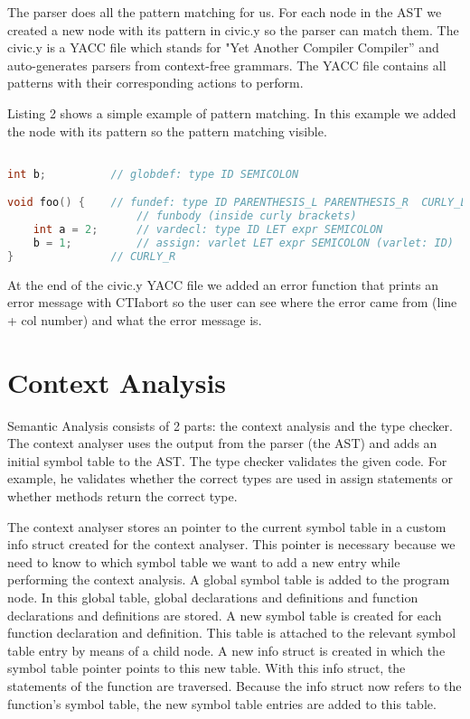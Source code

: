 \documentclass{uva-inf-article}
\begin{document}
The parser does all the pattern matching for us. For each node in the AST we created 
a new node with its pattern in civic.y so the parser can match them. The civic.y is a
YACC file which stands for "Yet Another Compiler Compiler” and auto-generates parsers
from context-free grammars. The YACC file contains all patterns with their corresponding
actions to perform.

Listing 2 shows a simple example of pattern matching. In this example we added the
node with its pattern so the pattern matching visible. 

\begin{lstlisting}[basicstyle=\small, language=C, label=lst:code, caption=Pattern matching Example, captionpos=b]

int b;          // globdef: type ID SEMICOLON

void foo() {    // fundef: type ID PARENTHESIS_L PARENTHESIS_R  CURLY_L
                    // funbody (inside curly brackets)
    int a = 2;      // vardecl: type ID LET expr SEMICOLON
    b = 1;          // assign: varlet LET expr SEMICOLON (varlet: ID)
}               // CURLY_R 
\end{lstlisting}

At the end of the civic.y YACC file we added an error function that prints an error message
with CTIabort so the user can see where the error came from (line + col number) and what
the error message is. 

\section{Context Analysis}
Semantic Analysis consists of 2 parts: the context analysis and the type checker. The context
analyser uses the output from the parser (the AST) and adds an initial symbol table to the AST.
The type checker validates the given code. For example, he validates whether the correct 
types are used in assign statements or whether methods return the correct type.

The context analyser stores an pointer to the current symbol table in a custom info struct created for the context analyser.
This pointer is necessary because we need to know to which symbol table we want to add a new entry while performing the context analysis.
A global symbol table is added to the program node.
In this global table, global declarations and definitions and function declarations and definitions are stored.
A new symbol table is created for each function declaration and definition. 
This table is attached to the relevant symbol table entry by means of a child node.
A new info struct is created in which the symbol table pointer points to this new table. 
With this info struct, the statements of the function are traversed. 
Because the info struct now refers to the function's symbol table, the new symbol table entries are added to this table.
\end{document}
